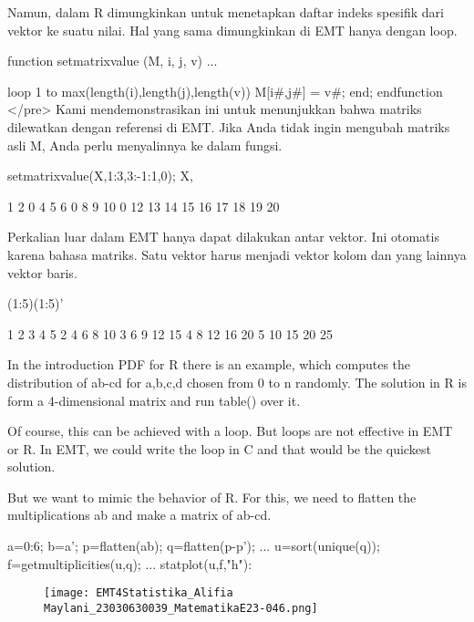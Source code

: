 \documentclass{article}
\begin{document}
Namun, dalam R dimungkinkan untuk menetapkan daftar indeks spesifik
dari vektor ke suatu nilai. Hal yang sama dimungkinkan di EMT hanya
dengan loop.


\>function setmatrixvalue (M, i, j, v) ...


    loop 1 to max(length(i),length(j),length(v))
       M[i{#},j{#}] = v{#};
    end;
    endfunction
</pre>
Kami mendemonstrasikan ini untuk menunjukkan bahwa matriks dilewatkan
dengan referensi di EMT. Jika Anda tidak ingin mengubah matriks asli
M, Anda perlu menyalinnya ke dalam fungsi.


\>setmatrixvalue(X,1:3,3:-1:1,0); X,


            1         2         0         4         5 
            6         0         8         9        10 
            0        12        13        14        15 
           16        17        18        19        20 

Perkalian luar dalam EMT hanya dapat dilakukan antar vektor. Ini
otomatis karena bahasa matriks. Satu vektor harus menjadi vektor kolom
dan yang lainnya vektor baris.


\>(1:5)\*(1:5)'


            1         2         3         4         5 
            2         4         6         8        10 
            3         6         9        12        15 
            4         8        12        16        20 
            5        10        15        20        25 

In the introduction PDF for R there is an example, which computes the distribution of ab-cd
for a,b,c,d chosen from 0 to n randomly. The solution in R is form a 4-dimensional matrix and
run table() over it.


Of course, this can be achieved with a loop. But loops are not effective in EMT or R. In EMT,
we could write the loop in C and that would be the quickest solution.


But we want to mimic the behavior of R. For this, we need to flatten the multiplications ab
and make a matrix of ab-cd.


\>a=0:6; b=a'; p=flatten(a\*b); q=flatten(p-p'); ...  
\>   u=sort(unique(q)); f=getmultiplicities(u,q); ...  
\>   statplot(u,f,"h"):


\begin{figure}
    \centering
    \texttt{[image: EMT4Statistika\_Alifia Maylani\_23030630039\_MatematikaE23-046.png]}
    \caption{}
    \label{fig:enter-label}
\end{figure}
\end{document}
